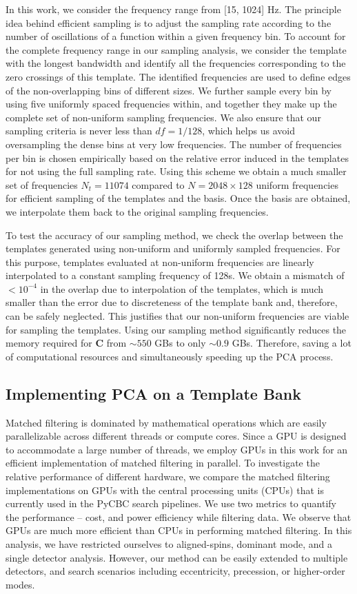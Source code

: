 In this work, we consider the frequency range from [15, 1024] Hz. The principle idea behind efficient sampling is to adjust the sampling rate according to the number of oscillations of a function within a given frequency bin. To account for the complete frequency range in our sampling analysis, we consider the template with the longest bandwidth and identify all the frequencies corresponding to the zero crossings of this template. The identified frequencies are used to define edges of the non-overlapping bins of different sizes. We further sample every bin by using five uniformly spaced frequencies within, and together they make up the complete set of non-uniform sampling frequencies. We also ensure that our sampling criteria is never less than $df = 1/128$, which helps us avoid oversampling the dense bins at very low frequencies. The number of frequencies per bin is chosen empirically based on the relative error induced in the templates for not using the full sampling rate. Using this scheme we obtain a much smaller set of frequencies $N_t = 11074$ compared to $N=2048\times128$ uniform frequencies for efficient sampling of the templates and the basis. Once the basis are obtained, we interpolate them back to the original sampling frequencies.


To test the accuracy of our sampling method, we check the overlap between the templates generated using non-uniform and uniformly sampled frequencies. For this purpose, templates evaluated at non-uniform frequencies are linearly interpolated to a constant sampling frequency of 128s. We obtain a mismatch of $< 10^{-4}$ in the overlap due to interpolation of the templates, which is much smaller than the error due to discreteness of the template bank and, therefore, can be safely neglected. This justifies that our non-uniform frequencies are viable for sampling the templates. Using our sampling method significantly reduces the memory required for $\textbf{C}$ from $\sim 550$ GBs to only $\sim 0.9$ GBs. Therefore, saving a lot of computational resources and simultaneously speeding up the PCA process.


\subsection{Implementing PCA on a Template Bank}

Matched filtering is dominated by mathematical operations which are easily parallelizable across different threads or compute cores. Since a GPU is designed to accommodate a large number of threads, we employ GPUs in this work for an efficient implementation of matched filtering in parallel. To investigate the relative performance of different hardware, we compare the matched filtering implementations on GPUs with the central processing units (CPUs) that is currently used in the PyCBC search pipelines. We use two metrics to quantify the performance -- cost, and power efficiency while filtering data. We observe that GPUs are much more efficient than CPUs in performing matched filtering. In this analysis, we have restricted ourselves to aligned-spins, dominant mode, and a single detector analysis. However, our method can be easily extended to multiple detectors, and search scenarios including eccentricity, precession, or higher-order modes.


